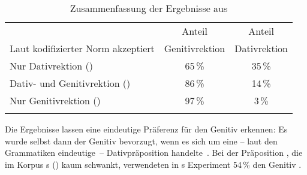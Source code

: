 \begin{table}
\centering
\begin{tabularx}{\textwidth}{Qcc}
\lsptoprule
                                                 & Anteil  & Anteil  \\
Laut kodifizierter Norm akzeptiert               & Genitivrektion & Dativrektion\\
\midrule
Nur Dativrektion ()        & 65\,\%                    & 35\,\%                  \\
Dativ- und Genitivrektion ()  & 86\,\%                    & 14\,\%                  \\
Nur Genitivrektion  ()  & 97\,\%                    & 3\,\%                   \\
\lspbottomrule
\end{tabularx}
\caption{Zusammenfassung der Ergebnisse aus \citet[210]{Becker2011}}
\label{table:Becker2011}
\end{table}

Die Ergebnisse lassen eine eindeutige Präferenz für den Genitiv erkennen: 
{\glqq}Es wurde selbst dann der Genitiv bevorzugt, wenn es sich um eine -- laut den Grammatiken eindeutige~-- Dativpr{\"a}position handelte{\grqq}~\citep[211]{Becker2011}. 
Bei der Präposition , die im Korpus \citeauthor{DiMeola2000}s (\citeyear{DiMeola2000}) kaum schwankt, verwendeten in \citeauthor{Becker2011}s Experiment 54\,\% den Genitiv \citep[s.][211]{Becker2011}. 


